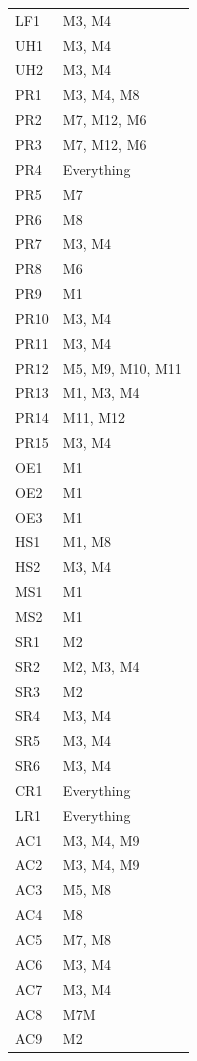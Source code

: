\documentclass[12pt, titlepage]{article}
\begin{document}
\begin{longtable}{p{} p{}}
  LF1  & M3, M4 \\
  UH1  & M3, M4 \\
  UH2  & M3, M4 \\
  PR1  & M3, M4, M8 \\
  PR2  & M7, M12, M6 \\
  PR3  & M7, M12, M6 \\
  PR4  & Everything \\
  PR5  & M7 \\
  PR6  & M8 \\
  PR7  & M3, M4 \\
  PR8  & M6 \\
  PR9  & M1 \\
  PR10 & M3, M4 \\
  PR11 & M3, M4 \\
  PR12 & M5, M9, M10, M11 \\
  PR13 & M1, M3, M4 \\
  PR14 & M11, M12 \\
  PR15 & M3, M4 \\
  OE1  & M1 \\
  OE2  & M1 \\
  OE3  & M1 \\
  HS1  & M1, M8 \\
  HS2  & M3, M4 \\
  MS1  & M1 \\
  MS2  & M1 \\
  SR1  & M2 \\
  SR2  & M2, M3, M4 \\
  SR3  & M2 \\
  SR4  & M3, M4 \\
  SR5  & M3, M4 \\
  SR6  & M3, M4 \\
  CR1  & Everything \\
  LR1  & Everything \\
  AC1  & M3, M4, M9 \\
  AC2  & M3, M4, M9 \\
  AC3  & M5, M8 \\
  AC4  & M8 \\
  AC5  & M7, M8 \\
  AC6  & M3, M4 \\
  AC7  & M3, M4 \\
  AC8  & M7M \\
  AC9  & M2 \\
  \end{longtable}
\end{document}
